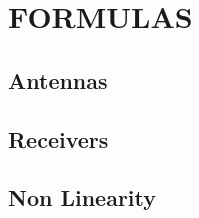 













        





	\chapter{FORMULAS} %

		\label{cha:formulas}

		\section{Antennas} %
			\label{sec:antennas}
			
		\section{Receivers} %
			\label{sec:receivers}
			
		\section{Non Linearity} %
			\label{sec:non_linearity}
			


%



